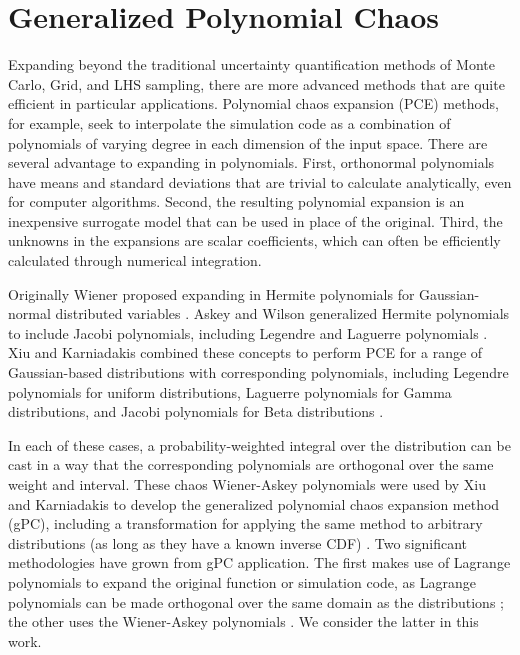 \section{Generalized Polynomial Chaos}
Expanding beyond the traditional uncertainty quantification methods of Monte Carlo, Grid, and LHS sampling, there are more
advanced methods that are quite efficient in particular applications.
Polynomial chaos expansion (PCE) methods, for example, seek to interpolate the simulation code as a combination of
polynomials of varying degree in each dimension of the input space.  There are several advantage to expanding
in polynomials.  First, orthonormal polynomials have means and standard deviations that are trivial to calculate
analytically, even for computer algorithms.  Second, the resulting polynomial expansion is an
inexpensive surrogate model that can be used in place of the original.  Third, the unknowns in the expansions
are scalar coefficients, which can often be efficiently calculated through numerical integration.

Originally Wiener
proposed expanding in Hermite polynomials for Gaussian-normal distributed variables \cite{wiener}.  Askey and
Wilson generalized Hermite polynomials to include Jacobi polynomials, including Legendre and Laguerre
polynomials \cite{Wiener-Askey}.  Xiu and Karniadakis combined these concepts to perform PCE for a range of Gaussian-based
distributions with corresponding polynomials,
including Legendre polynomials for uniform distributions, Laguerre polynomials for Gamma distributions, and
Jacobi polynomials for Beta distributions \cite{xiu}.

In each of these cases, a probability-weighted
integral over the distribution can be cast in a way that the corresponding polynomials are orthogonal over the
same weight and interval.  These chaos Wiener-Askey polynomials were used by Xiu and Karniadakis to develop
the generalized polynomial chaos expansion method (gPC), including a transformation for applying the same
method to arbitrary distributions (as long as they have a known inverse CDF) \cite{xiu}.  Two significant
methodologies have grown from gPC application.  The first makes use of Lagrange polynomials to expand the
original function or simulation code, as Lagrange polynomials can be made orthogonal over the same domain as the
distributions \cite{SCLagrange}; the other uses the Wiener-Askey polynomials \cite{xiu}.  We consider the latter in this work.

